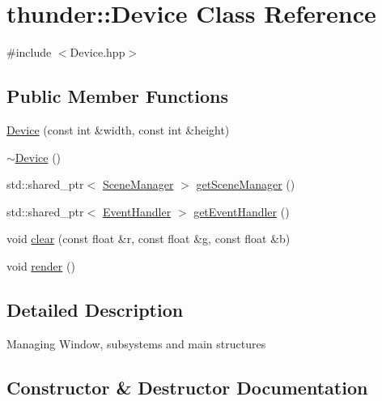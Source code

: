 \hypertarget{classthunder_1_1_device}{}\section{thunder\+:\+:Device Class Reference}
\label{classthunder_1_1_device}


{\ttfamily \#include $<$Device.\+hpp$>$}

\subsection*{Public Member Functions}
\begin{DoxyCompactItemize}
\item 
\mbox{\hyperlink{classthunder_1_1_device_adcb72b3e1fe6300eb0b230a714752d6c}{Device}} (const int \&width, const int \&height)
\item 
\mbox{\hyperlink{classthunder_1_1_device_abc93ee78a90cf3084d52608183a48284}{$\sim$\+Device}} ()
\item 
std\+::shared\+\_\+ptr$<$ \mbox{\hyperlink{classthunder_1_1_scene_manager}{Scene\+Manager}} $>$ \mbox{\hyperlink{classthunder_1_1_device_ab71a4d27bde5e833e33cc88b199b7010}{get\+Scene\+Manager}} ()
\item 
std\+::shared\+\_\+ptr$<$ \mbox{\hyperlink{classthunder_1_1_event_handler}{Event\+Handler}} $>$ \mbox{\hyperlink{classthunder_1_1_device_a6f27c1621c83c334d00cc9b04f5d2d5d}{get\+Event\+Handler}} ()
\item 
void \mbox{\hyperlink{classthunder_1_1_device_ab6a17ea2f5c6e68fea19bf3aea014a61}{clear}} (const float \&r, const float \&g, const float \&b)
\item 
void \mbox{\hyperlink{classthunder_1_1_device_a88fd3ad1c16d755cca56e031cbd137d4}{render}} ()
\end{DoxyCompactItemize}


\subsection{Detailed Description}
Managing Window, subsystems and main structures 

\subsection{Constructor \& Destructor Documentation}
\mbox{\label{classthunder_1_1_device_adcb72b3e1fe6300eb0b230a714752d6c}} 
